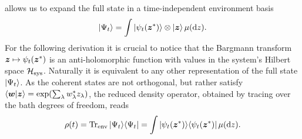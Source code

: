  allows us to expand the full state in a time-independent environment basis
\begin{equation*}
  | \Psi_t \rangle = \int | \psi_t({\boldsymbol{z}}^*) \rangle \otimes | \boldsymbol{z} \rangle \, \mu(\mathrm{d} z).
\end{equation*}
For the following derivation it is crucial to notice that the Bargmann transform $\boldsymbol{z} \mapsto \psi_t({\boldsymbol{z}}^*)$ is an anti-holomorphic function with values in the system's Hilbert space $\mathcal{H}_\mathrm{sys}$.
Naturally it is equivalent to any other representation of the full state $| \Psi_t \rangle$.
As the coherent states are not orthogonal, but rather satisfy $\braket{\vec w}{\vec z} = \exp(\sum_\lambda \cc w_\lambda z_\lambda)$, the reduced density operator, obtained by tracing over the bath degrees of freedom, reads
\begin{equation}
  \rho(t) = \operatorname{Tr}_\mathrm{env} | \Psi_t \rangle\langle \Psi_t |
          = \int | \psi_t({\boldsymbol{z}}^*) \rangle\langle \psi_t({\boldsymbol{z}}^*) | \, \mu(\mathrm{d} z).
  \label{eq:nmqsd.reduced_matrix}
\end{equation}

